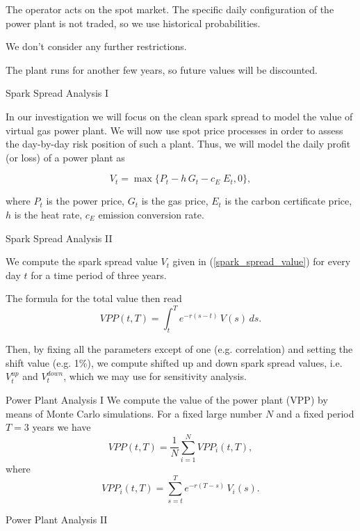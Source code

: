 	The operator acts on the spot market. The specific daily configuration of the power plant is not traded, so we use historical probabilities.


	We don't consider any further restrictions.


	The plant runs for another few years, so future values will be discounted.





{Spark Spread Analysis I}

In our investigation we will focus on the clean spark spread to model the value of virtual gas power plant. We will now use spot price processes in order to assess the day-by-day risk position of such a plant. Thus, we will model the daily profit (or loss) of a power plant as

\begin{equation}
V_t = \max\{P_t - h\,G_t - c_E\;E_t, 0\},
\label{spark_spread_value}
\end{equation}

where $P_t$ is the power price, $G_t$ is the gas price, $E_t$ is the carbon certificate price, $h$ is the heat rate, $c_E$ emission conversion rate.

{Spark Spread Analysis II}






	We compute the spark spread value $V_t$ given in (\ref{spark_spread_value}) for every day $t$ for a time period of three years.


	
The formula for the total value then read
$$VPP(t,T) = \int_{t}^{T}e^{-r(s-t)}\,V(s)\,ds.$$



	Then, by fixing all the parameters except of one (e.g. correlation) and setting the shift value (e.g. 1\%), we compute shifted up and down spark spread values, i.e. $V^{up}_t$ and $V^{down}_t$, which we may use for sensitivity analysis.





{Power Plant Analysis I}
  We compute the value of the power plant (VPP) by means of Monte Carlo simulations. For a fixed large number $N$ and a fixed period $T=3$ years we have $$VPP(t,T) = \frac{1}{N}\sum_{i=1}^{N}VPP_i(t,T),$$ where $$VPP_i(t,T) = \sum_{s=t}^{T}e^{-r(T-s)}\,V_i(s).$$

{Power Plant Analysis II}



